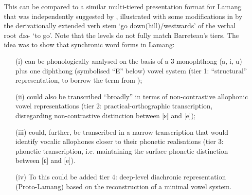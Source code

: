 \documentclass[output=paper]{langscibook}
\begin{document}
This can be compared to a similar multi-tiered presentation format for Lamang  that was independently suggested by \citet[37]{Wolff1983b}, illustrated with some modifications in  by the derivationally extended verb stem ‘go down(hill)/westwards’ of the verbal root \textit{dza}- ‘to go’. Note that the levels do not fully match Barreteau’s tiers. The idea was to show that synchronic word forms in Lamang:

\begin{itemize}
\item[(i)] can be phonologically analysed on the basis of a 3-monophthong (a, i, u) plus one diphthong (symbolised ``E'' below) vowel system (tier 1: ``structural'' representation, to borrow the term from \citealt{Barreteau1983});
\item[(ii)] could also be transcribed ``broadly'' in terms of non-contrastive allophonic vowel representations (tier 2: practical-orthographic transcription, disregarding non-contrastive distinction between [ɛ] and [e]);
\item[(iii)] could, further, be transcribed in a narrow transcription that would identify vocalic allophones closer to their phonetic realisations (tier 3: phonetic transcription, i.e. maintaining the surface phonetic distinction between [ɛ] and [e]). 
\item[(iv)] To this could be added tier 4: deep-level diachronic representation (Proto-Lamang) based on the reconstruction of a minimal vowel system.
\end{itemize}
\end{document}
